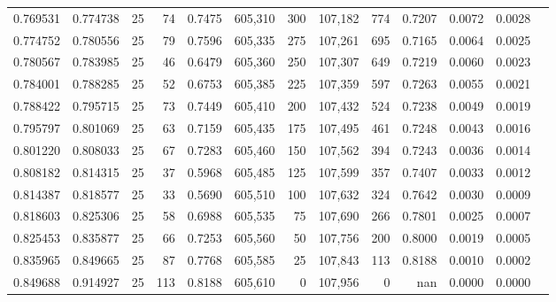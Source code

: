 \begin{tabular}{rrrrrrrrrrrrr}
0.769531 & 0.774738 &    25 &  74 &                                     0.7475 & 605,310 &     300 & 107,182 &     774 & 0.7207 & 0.0072 & 0.0028 \\
0.774752 & 0.780556 &    25 &  79 &                                     0.7596 & 605,335 &     275 & 107,261 &     695 & 0.7165 & 0.0064 & 0.0025 \\
0.780567 & 0.783985 &    25 &  46 &                                     0.6479 & 605,360 &     250 & 107,307 &     649 & 0.7219 & 0.0060 & 0.0023 \\
0.784001 & 0.788285 &    25 &  52 &                                     0.6753 & 605,385 &     225 & 107,359 &     597 & 0.7263 & 0.0055 & 0.0021 \\
0.788422 & 0.795715 &    25 &  73 &                                     0.7449 & 605,410 &     200 & 107,432 &     524 & 0.7238 & 0.0049 & 0.0019 \\
0.795797 & 0.801069 &    25 &  63 &                                     0.7159 & 605,435 &     175 & 107,495 &     461 & 0.7248 & 0.0043 & 0.0016 \\
0.801220 & 0.808033 &    25 &  67 &                                     0.7283 & 605,460 &     150 & 107,562 &     394 & 0.7243 & 0.0036 & 0.0014 \\
0.808182 & 0.814315 &    25 &  37 &                                     0.5968 & 605,485 &     125 & 107,599 &     357 & 0.7407 & 0.0033 & 0.0012 \\
0.814387 & 0.818577 &    25 &  33 &                                     0.5690 & 605,510 &     100 & 107,632 &     324 & 0.7642 & 0.0030 & 0.0009 \\
0.818603 & 0.825306 &    25 &  58 &                                     0.6988 & 605,535 &      75 & 107,690 &     266 & 0.7801 & 0.0025 & 0.0007 \\
0.825453 & 0.835877 &    25 &  66 &                                     0.7253 & 605,560 &      50 & 107,756 &     200 & 0.8000 & 0.0019 & 0.0005 \\
0.835965 & 0.849665 &    25 &  87 &                                     0.7768 & 605,585 &      25 & 107,843 &     113 & 0.8188 & 0.0010 & 0.0002 \\
0.849688 & 0.914927 &    25 & 113 &                                     0.8188 & 605,610 &       0 & 107,956 &       0 &    nan & 0.0000 & 0.0000 \\
\bottomrule
\end{tabular}
